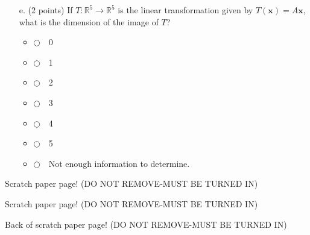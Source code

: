 \documentclass[12pt]{extarticle}
\newcommand{\chooseone}{{\Large$\Circle$\ \ }}
\begin{document}
\begin{enumerate}
\begin{itemize}
\vspace{0.2in}

\item[e.] (2 points) If $T:\mathbb{R}^5\to \mathbb{R}^5$ is the linear transformation given by $T(\mathbf{x})=A\mathbf{x}$, what is the dimension of the image of $T$?
\begin{itemize}[label={}]
\item \chooseone 0
\item \chooseone 1
\item \chooseone 2
\item \chooseone 3
\item \chooseone 4
\item \chooseone 5
\item \chooseone Not enough information to determine.
\end{itemize}



\end{itemize}


\newpage






\newpage




    

\newpage






\newpage







\end{enumerate}


\newpage

Scratch paper page! (DO NOT REMOVE-MUST BE TURNED IN)

\newpage

Scratch paper page! (DO NOT REMOVE-MUST BE TURNED IN)

\newpage

Back of scratch paper page! (DO NOT REMOVE-MUST BE TURNED IN)
\end{document}
